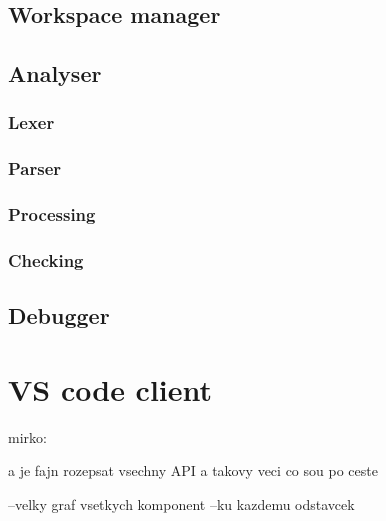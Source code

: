 \subsection{Workspace manager}

\subsection{Analyser}

\subsubsection{Lexer}
\subsubsection{Parser}
\subsubsection{Processing}
\subsubsection{Checking}






\subsection{Debugger}



\section{VS code client}

mirko:

a je fajn rozepsat vsechny API a takovy veci co sou po ceste

--velky graf vsetkych komponent
--ku kazdemu odstavcek 